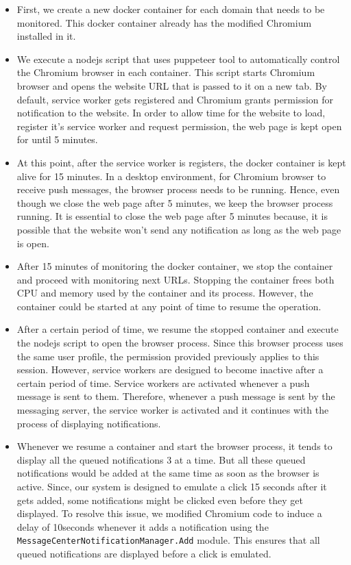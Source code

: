 \begin{itemize}
    \item First, we create a new docker container for each domain that needs to be monitored. This docker container already has the modified Chromium installed in it. 
    \item We execute a nodejs script that uses puppeteer tool to automatically control the Chromium browser in each container. This script starts Chromium browser and opens the website URL that is passed to it on a new tab. By default, service worker  gets registered and Chromium grants permission for notification to the website. In order to allow time for the website to load, register it's service worker and request permission, the web page is kept open for until 5 minutes. 
    \item At this point, after the service worker is registers, the docker container is kept alive for 15 minutes. In a desktop environment, for Chromium browser to receive push messages, the browser process needs to be running. Hence, even though we close the web page after 5 minutes, we keep the browser process running. It is essential to close the web page after 5 minutes because, it is possible that the website won't send any notification as long as the web page is open.
    \item After 15 minutes of monitoring the docker container, we stop the container and proceed with monitoring next URLs. Stopping the container frees both CPU and memory used by the container and its process. However, the container could be started at any point of time to resume the operation.
    \item After a certain period of time, we resume the stopped container and execute the nodejs script to open the browser process. Since this browser process uses the same user profile, the permission provided previously applies to this session. However, service workers are designed to become inactive after a certain period of time. Service workers are activated whenever a push message is sent to them. Therefore, whenever a push message is sent by the messaging server, the service worker is activated and it continues with the process of displaying notifications.
    \item Whenever we resume a container and start the browser process, it tends to display all the queued notifications 3 at a time. But all these queued notifications would be added at the same time as soon as the browser is active. Since, our system is designed to emulate a click 15 seconds after it gets added, some notifications might be clicked even before they get displayed. To resolve this issue, we modified Chromium code to induce a delay of 10seconds whenever it adds a notification using the \texttt{MessageCenterNotificationManager.Add} module. This ensures that all queued notifications are displayed before a click is emulated.

\end{itemize}
